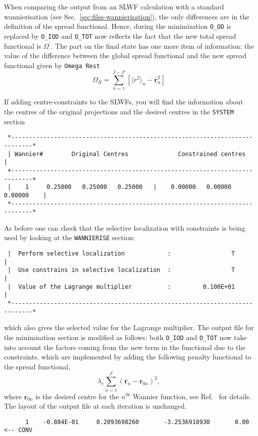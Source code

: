 When comparing the output from an SLWF calculation with a standard 
wannierisation (see Sec.~\ref{sec:files-wannierisation}), the only differences 
are in the definition of the spread functional.
Hence, during the minimization \texttt{O\_OD} is replaced by \texttt{O\_IOD}
and \texttt{O\_TOT} now reflects the fact that the new total spread
functional is $\Omega^{'}$.    
The part on the final state has one more item of information: the value of the difference
between the global spread functional and the new spread functional given by 
\texttt{Omega Rest}
$$\Omega_{R} = \sum_{n=1}^{J-J'} \left[\langle r^2 \rangle_n - \overline{\mathbf{r}}_{n}^{2} \right]$$

If adding centre-constraints to the SLWFs,
you will find the information about the centres of the original projections and 
the desired centres in the {\tt SYSTEM} section
\begin{verbatim}
 *----------------------------------------------------------------------------*
 | Wannier#        Original Centres              Constrained centres          |
 +----------------------------------------------------------------------------+
 |    1     0.25000   0.25000   0.25000   |    0.00000   0.00000   0.00000    |
 *----------------------------------------------------------------------------*
\end{verbatim}
As before one can check that the selective localization with constraints is 
being used by
looking at the {\tt WANNIERISE} section:
\begin{verbatim}
 |  Perform selective localization            :                 T             |
 |  Use constrains in selective localization  :                 T             |
 |  Value of the Lagrange multiplier          :         0.100E+01             |
 *----------------------------------------------------------------------------*
\end{verbatim}
which also gives the selected value for the Lagrange multiplier.
The output file for the minimisation section is modified as follows: 
both {\tt O\_IOD} and {\tt O\_TOT} now take into account
the factors coming from the new term in the functional due to the constraints,
which are implemented by adding the following penalty functional to the spread functional,
$$\lambda_c \sum_{n=1}^{J'} \left(\overline{\mathbf{r}}_n - \mathbf{r}_{0n} \right)^2,$$
where $\mathbf{r}_{0n}$ is the desired centre for the $n^{\text{th}}$ Wannier function, 
see Ref.~\cite{Marianetti} for details.
The layout of the output file at each iteration is unchanged.
\begin{verbatim}
      1    -0.884E-01     0.2093698260       -3.2536918930       0.00  <-- CONV
\end{verbatim}

